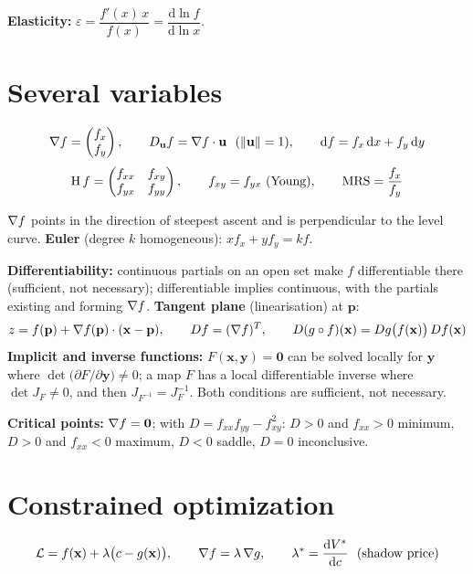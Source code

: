 \textbf{Elasticity:}
$\varepsilon=\dfrac{f'(x)\,x}{f(x)}=\dfrac{\mathrm{d}\ln f}
{\mathrm{d}\ln x}$.

\section*{Several variables}

\[
  \nabla f=\begin{pmatrix} f_{x}\\ f_{y}\end{pmatrix},\qquad
  D_{\mathbf{u}}f=\nabla f\cdot\mathbf{u}\ \ (\|\mathbf{u}\|=1),\qquad
  \mathrm{d}f=f_{x}\,\mathrm{d}x+f_{y}\,\mathrm{d}y
\]
\[
  \operatorname{H} f=\begin{pmatrix} f_{xx} & f_{xy}\\ f_{yx} & f_{yy}\end{pmatrix},
  \qquad f_{xy}=f_{yx}\ \text{(Young)},\qquad
  \mathrm{MRS}=\frac{f_{x}}{f_{y}}
\]

$\nabla f$ points in the direction of steepest ascent and is perpendicular
to the level curve. \textbf{Euler} (degree $k$ homogeneous):
$x f_{x}+y f_{y}=k f$.

\textbf{Differentiability:} continuous partials on an open set make $f$
differentiable there (sufficient, not necessary); differentiable implies
continuous, with the partials existing and forming $\nabla f$.
\textbf{Tangent plane} (linearisation) at $\mathbf{p}$:
\[
  z=f(\mathbf{p})+\nabla f(\mathbf{p})\cdot(\mathbf{x}-\mathbf{p}),\qquad
  Df=(\nabla f)^{T},\qquad
  D(g\circ f)(\mathbf{x})=Dg\bigl(f(\mathbf{x})\bigr)\,Df(\mathbf{x})
\]
\textbf{Implicit and inverse functions:} $F(\mathbf{x},\mathbf{y})=\mathbf{0}$
can be solved locally for $\mathbf{y}$ where
$\det\bigl(\partial F/\partial\mathbf{y}\bigr)\neq0$; a map $F$ has a
local differentiable inverse where $\det J_{F}\neq0$, and then
$J_{F^{-1}}=J_{F}^{-1}$. Both conditions are sufficient, not necessary.

\textbf{Critical points:} $\nabla f=\mathbf{0}$; with
$D=f_{xx}f_{yy}-f_{xy}^{2}$: $D>0$ and $f_{xx}>0$ minimum, $D>0$ and
$f_{xx}<0$ maximum, $D<0$ saddle, $D=0$ inconclusive.

\section*{Constrained optimization}

\[
  \mathcal{L}=f(\mathbf{x})+\lambda\bigl(c-g(\mathbf{x})\bigr),\qquad
  \nabla f=\lambda\,\nabla g,\qquad
  \lambda^{*}=\frac{\mathrm{d}V^{*}}{\mathrm{d}c}
  \ \ \text{(shadow price)}
\]

